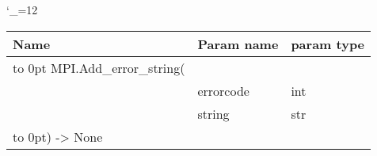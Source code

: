 \begingroup \catcode`\_=12 \tt
\begin{tabular}{lll}
\toprule
\textrm{Name}&\textrm{Param name}&\textrm{param type}\\
\midrule
\hbox to 0pt {MPI.Add_error_string(\hss}\\
& errorcode & int\\
& string & str\\
\hbox to 0pt{) -> None\hss}\\
\bottomrule
\end{tabular}
\endgroup
